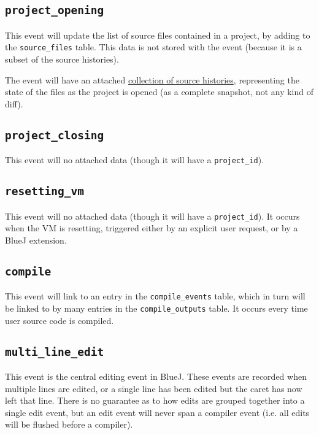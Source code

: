 \documentclass{book}
\begin{document}
\subsection{\texttt{project\_opening}}

This event will update the list of source files contained in a project, by
adding to the \texttt{source\_files} table.  This data is not stored with the
event (because it is a subset of the source histories).

The event will have an attached \hyperref[tab:source_histories]{collection of
  source histories}, representing the state of the files as the project is
opened (as a complete snapshot, not any kind of diff).

\subsection{\texttt{project\_closing}}

This event will no attached data (though it will have a \texttt{project\_id}).

\subsection{\texttt{resetting\_vm}}

This event will no attached data (though it will have a
\texttt{project\_id}).  It occurs when the VM is resetting, triggered either
by an explicit user request, or by a BlueJ extension.

\subsection{\texttt{compile}}

This event will link to an entry in the \texttt{compile\_events} table, which
in turn will be linked to by many entries in the \texttt{compile\_outputs}
table.  It occurs every time user source code is compiled.

\subsection{\texttt{multi_line_edit}}

This event is the central editing event in BlueJ.  These events are recorded
when multiple lines are edited, or a single line has been edited but the caret
has now left that line.  There is no guarantee as to how edits are grouped
together into a single edit event, but an edit event will never span a
compiler event (i.e. all edits will be flushed before a compiler).
\end{document}
